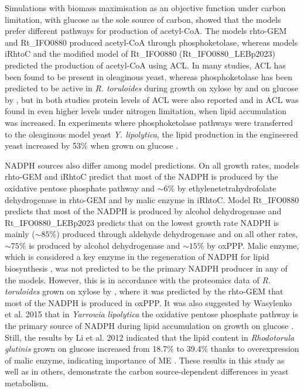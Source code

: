 Simulations with biomass maximisation as an objective function under carbon limitation, with glucose as the sole source of carbon, showed that the models prefer different pathways for 
production of acetyl-CoA. The models rhto-GEM and Rt\_IFO0880 produced acetyl-CoA through phosphoketolase, whereas models iRhtoC and the modified model 
of Rt\_IFO0880 (Rt\_IFO0880\_LEBp2023) predicted the production of acetyl-CoA using ACL. In many studies, ACL has been found to be present in oleaginous yeast, whereas phosphoketolase has been predicted to be active in \textit{R. toruloides} during growth on xylose by \cite{Pinheiro2020, Rekena2023} and on glucose by \cite{Rekena2023}, but in both studies protein levels of ACL were also reported and in \cite{Pinheiro2020} ACL was found in even higher levels under nitrogen limitation, when lipid accumulation was increased.  %
In experiments where phosphoketolase pathways were transferred to the oleaginous model yeast \textit{Y. lipolytica}, the lipid production in the engineered yeast increased by 53\% when grown on glucose \cite{Xu2016}.

NADPH sources also differ among model predictions. On all growth rates, models rhto-GEM and iRhtoC predict that most of the NADPH is produced by the oxidative pentose phosphate pathway and $\sim 6\%$ by ethylenetetrahydrofolate dehydrogenase in rhto-GEM and by malic enzyme in iRhtoC. Model Rt\_IFO0880 predicts that most of the NADPH is produced by alcohol dehydrogenase and Rt\_IFO0880\_LEBp2023 predicts that on the lowest growth rate NADPH is mainly ($\sim 85\%$) produced through aldehyde dehydrogenase and on all other rates, $\sim 75\%$ is produced by alcohol dehydrogenase and $\sim 15\%$ by oxPPP. Malic enzyme, which is considered a key enzyme in the regeneration of NADPH for lipid biosynthesis \cite{Ratledge2002}, was not predicted to be the primary NADPH producer in any of the models. However, this is in accordance with the proteomics data of \textit{R. toruloides} grown on xylose by \cite{Pinheiro2020}, where it was predicted by the rhto-GEM that most of the NADPH is produced in oxPPP. It was also suggested by Wasylenko et al. 2015 that in \textit{Yarrowia lipolytica} the oxidative pentose phosphate pathway is the primary source of NADPH during lipid accumulation on growth on glucose \cite{Wasylenko2015}. Still, the results by Li et al. 2012 indicated that the lipid content in \textit{Rhodotorula glutinis} grown on glucose increased from 18.7\% to 39.4\% thanks to overexpression of malic enzyme, indicating importance of ME \cite{Li2012}. These results in this study as well as in others, demonstrate the carbon source-dependent differences in yeast metabolism.

